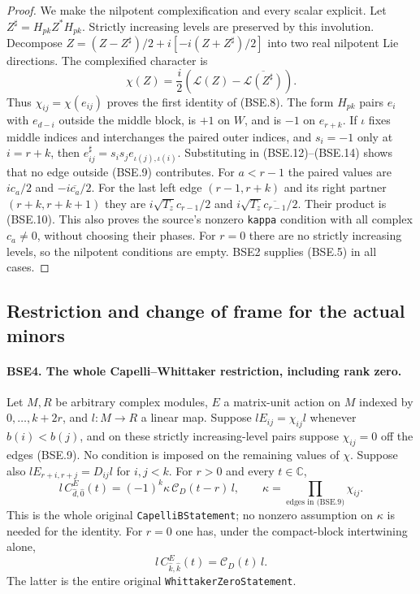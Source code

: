 \begin{proof}
We make the nilpotent complexification and every scalar explicit.
Let $Z^\sharp=H_{pk}Z^*H_{pk}$.  Strictly increasing levels are
preserved by this involution.  Decompose
$Z=(Z-Z^\sharp)/2+i[-i(Z+Z^\sharp)/2]$ into two real
nilpotent Lie directions.  The complexified character is
\[
 \chi(Z)=\frac i2
       \left(\mathcal L(Z)-\overline{\mathcal L(Z^\sharp)}\right).
 \tag{BSE.14}
\]
Thus $\chi_{ij}=\chi(e_{ij})$ proves the first identity of (BSE.8).
The form $H_{pk}$ pairs $e_i$ with $e_{d-i}$ outside the middle
block, is $+1$ on $W$, and is $-1$ on $e_{r+k}$.
If $\iota$ fixes middle indices and interchanges the paired outer
indices, and $s_i=-1$ only at $i=r+k$, then
$e_{ij}^\sharp=s_is_j e_{\iota(j),\iota(i)}$.
Substituting in (BSE.12)--(BSE.14) shows that no edge outside
(BSE.9) contributes.  For $a<r-1$ the paired values are
$ic_a/2$ and $-i\overline{c_a}/2$.
For the last left edge $(r-1,r+k)$ and its right partner
$(r+k,r+k+1)$ they are
$i\sqrt{T_z}c_{r-1}/2$ and
$i\sqrt{T_z}\overline{c_{r-1}}/2$.
Their product is (BSE.10).
This also proves the source's nonzero \texttt{kappa} condition
with all complex $c_a\ne0$, without choosing their phases.
For $r=0$ there are no strictly increasing levels, so the nilpotent
conditions are empty.  BSE2 supplies (BSE.5) in all cases.
\end{proof}

\subsection{Restriction and change of frame for the actual minors}

\paragraph{BSE4. The whole Capelli--Whittaker restriction, including rank zero.}
\label{claim:BSE4}
Let $M,R$ be arbitrary complex modules, $E$ a matrix-unit action
on $M$ indexed by $0,\ldots,k+2r$, and
$l:M\to R$ a linear map.  Suppose
$lE_{ij}=\chi_{ij}l$ whenever $b(i)<b(j)$, and on these
strictly increasing-level pairs suppose $\chi_{ij}=0$ off the
edges (BSE.9).  No condition is imposed on the remaining values
of $\chi$.  Suppose also
$lE_{r+i,r+j}=D_{ij}l$ for $i,j<k$.
For $r>0$ and every $t\in\mathbb C$,
\[
 l\,C^E_{\widehat d,\widehat0}(t)
       =(-1)^k\kappa\,\mathcal C_D(t-r)\,l,
       \qquad \kappa=\prod_{\text{edges in (BSE.9)}}\chi_{ij}.
 \tag{BSE.15}
\]
This is the whole original \texttt{CapelliBStatement}; no nonzero
assumption on $\kappa$ is needed for the identity.
For $r=0$ one has, under the compact-block intertwining alone,
\[
                   l\,C^E_{\widehat k,\widehat k}(t)
                                =\mathcal C_D(t)\,l.
 \tag{BSE.16}
\]
The latter is the entire original \texttt{WhittakerZeroStatement}.


